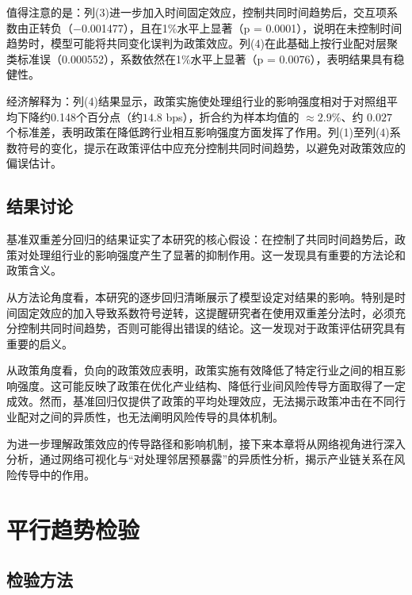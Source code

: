值得注意的是：列(3)进一步加入时间固定效应，控制共同时间趋势后，交互项系数由正转负（$-$0.001477），且在1\%水平上显著（p = 0.0001），说明在未控制时间趋势时，模型可能将共同变化误判为政策效应。列(4)在此基础上按行业配对层聚类标准误（0.000552），系数依然在1\%水平上显著（p = 0.0076），表明结果具有稳健性。

经济解释为：列(4)结果显示，政策实施使处理组行业的影响强度相对于对照组平均下降约0.148个百分点（约$14.8$ bps），折合约为样本均值的 $\approx2.9\%$、约 $0.027$ 个标准差，表明政策在降低跨行业相互影响强度方面发挥了作用。列(1)至列(4)系数符号的变化，提示在政策评估中应充分控制共同时间趋势，以避免对政策效应的偏误估计。


\subsection{结果讨论}

基准双重差分回归的结果证实了本研究的核心假设：在控制了共同时间趋势后，政策对处理组行业的影响强度产生了显著的抑制作用。这一发现具有重要的方法论和政策含义。

从方法论角度看，本研究的逐步回归清晰展示了模型设定对结果的影响。特别是时间固定效应的加入导致系数符号逆转，这提醒研究者在使用双重差分法时，必须充分控制共同时间趋势，否则可能得出错误的结论。这一发现对于政策评估研究具有重要的启义。

从政策角度看，负向的政策效应表明，政策实施有效降低了特定行业之间的相互影响强度。这可能反映了政策在优化产业结构、降低行业间风险传导方面取得了一定成效。然而，基准回归仅提供了政策的平均处理效应，无法揭示政策冲击在不同行业配对之间的异质性，也无法阐明风险传导的具体机制。

为进一步理解政策效应的传导路径和影响机制，接下来本章将从网络视角进行深入分析，通过网络可视化与“对处理邻居预暴露”的异质性分析，揭示产业链关系在风险传导中的作用。


\section{平行趋势检验}
\label{sec:parallel_trends}

\subsection{检验方法}

